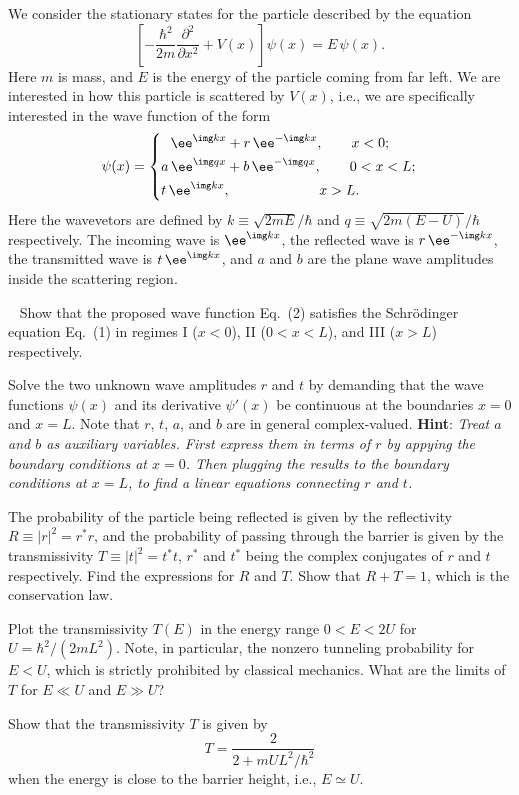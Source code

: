 \noindent
We consider the stationary states for the particle described by the equation
\begin{equation}
\left[-\frac{\hbar^2}{2m} \frac{\partial^2}{\partial x^2} + V(x) \right]\psi(x) = E\,\psi(x).
\end{equation}
Here $m$ is mass, and $E$ is the energy of the particle coming from far left.
We are interested in how this particle is scattered by $V(x)$, i.e.,
we are specifically interested in the wave function of the form
\begin{equation}
\psi(x) = \left\{\begin{aligned}
& \enskip\, \ee^{\img k x} + r\,\ee^{-\img k x},\qquad x < 0;\\
& a\, \ee^{\img q x} + b\,\ee^{-\img q x},\qquad 0 < x < L;\\
& t\, \ee^{\img k x}, \qquad\qquad\qquad\ x > L.
\end{aligned}\right.
\label{eq:fwave}
\end{equation}
Here the wavevetors are defined by $k\equiv\sqrt{2mE}/\hbar$ and $q\equiv\sqrt{2m(E-U)}/\hbar$ respectively.
The incoming wave is $\ee^{\img k x}$, the reflected wave is $r\,\ee^{-\img k x}$,
the transmitted wave is $t\,\ee^{\img k x}$,
and $a$ and $b$ are the plane wave amplitudes inside the scattering region.

\vfil\eject

\ \bigskip
\subp
Show that the proposed wave function Eq.~(2) satisfies the Schr\"odinger equation Eq.~(1)
in regimes I ($x<0$), II ($0 < x < L$), and III ($x > L$) respectively.

\smallskip
\subp
Solve the two unknown wave amplitudes $r$ and $t$ by demanding that the wave functions $\psi(x)$
and its derivative $\psi'(x)$ be continuous at the boundaries $x = 0$ and $x = L$.
Note that $r$, $t$, $a$, and $b$ are in general complex-valued.\hfil\break
{\bf Hint}: {\it Treat $a$ and $b$ as auxiliary variables.
First express them in terms of $r$ by appying the boundary conditions at $x =0$.
Then plugging the results to the boundary conditions at $x=L$,
to find a linear equations connecting $r$ and $t$.}

\smallskip
\subp
The probability of the particle being reflected is given by the reflectivity $R \equiv |r|^2 = r^* r$,
and the probability of passing through the barrier is given by the transmissivity $T \equiv |t|^2 = t^* t$,
$r^*$ and $t^*$ being the complex conjugates of $r$ and $t$ respectively.
Find the expressions for $R$ and $T$.
Show that $R + T = 1$, which is the conservation law.

\smallskip
\subp
Plot the transmissivity $T(E)$ in the energy range $0 < E < 2 U$ for $U = \hbar^2 / (2 m L^2)$.
Note, in particular, the nonzero tunneling probability for $E < U$,
which is strictly prohibited by classical mechanics.
What are the limits of $T$ for $E \ll U$ and $E \gg U$?

\smallskip
\subp
Show that the transmissivity $T$ is given by%
$$ T = \frac{2}{2 + m UL^2 /\hbar^2} $$
when the energy is close to the barrier height, i.e., $E \simeq U$.

